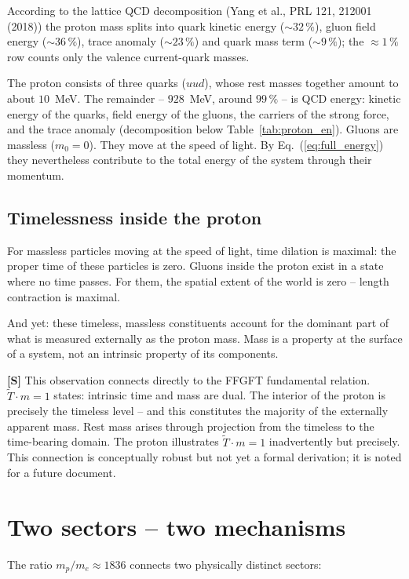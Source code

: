 \noindent According to the lattice QCD decomposition (Yang et al.,
PRL 121, 212001 (2018)) the proton mass splits into quark kinetic energy
($\sim 32\,\%$), gluon field energy ($\sim 36\,\%$), trace anomaly
($\sim 23\,\%$) and quark mass term ($\sim 9\,\%$); the $\approx 1\,\%$
row counts only the valence current-quark masses.

The proton consists of three quarks ($uud$), whose rest masses together
amount to about $10$~MeV. The remainder -- $928$~MeV, around $99\,\%$
-- is QCD energy: kinetic energy of the quarks, field energy of the
gluons, the carriers of the strong force, and the trace anomaly
(decomposition below Table~\ref{tab:proton_en}). Gluons are
massless ($m_0 = 0$). They move at the speed of light. By
Eq.~(\ref{eq:full_energy}) they nevertheless contribute to the total
energy of the system through their momentum.

\subsection{Timelessness inside the proton}

For massless particles moving at the speed of light, time dilation is
maximal: the proper time of these particles is zero. Gluons inside the
proton exist in a state where no time passes. For them, the spatial
extent of the world is zero -- length contraction is maximal.

And yet: these timeless, massless constituents account for the dominant
part of what is measured externally as the proton mass. Mass is a
property at the surface of a system, not an intrinsic property of its
components.

\textbf{[S]} This observation connects directly to the FFGFT fundamental
relation. $\tilde{T} \cdot m = 1$ states: intrinsic time and mass are
dual. The interior of the proton is precisely the timeless level -- and
this constitutes the majority of the externally apparent mass. Rest mass
arises through projection from the timeless to the time-bearing domain.
The proton illustrates $\tilde{T} \cdot m = 1$ inadvertently but
precisely. This connection is conceptually robust but not yet a formal
derivation; it is noted for a future document.

\section{Two sectors -- two mechanisms}

The ratio $m_p/m_e \approx 1836$ connects two physically distinct
sectors:

